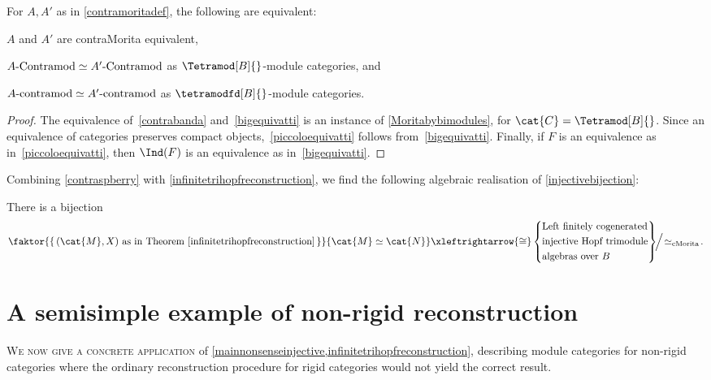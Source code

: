 \begin{proposition}\label{contraspberry}
  For \(A,A'\) as in \cref{contramoritadef}, the following are equivalent:
  \begin{thmlist}[noitemsep]
    \item\label{contrabanda} \(A\) and \(A'\) are contraMorita equivalent,
    \item\label{bigequivatti} \(A\textnormal{-Contramod} \simeq A'\textnormal{-Contramod}\) as \(\Tetramod[B]{}\)\hyp{}module categories, and
    \item\label{piccoloequivatti} \(A\textnormal{-contramod} \simeq A'\textnormal{-contramod}\) as \(\tetramodfd[B]{}\)\hyp{}module categories.
  \end{thmlist}
\end{proposition}
\begin{proof}
  The equivalence of~\ref{contrabanda} and~\ref{bigequivatti} is an instance of \cref{Moritabybimodules},
  for \(\cat{C} = \Tetramod[B]{}\).
  Since an equivalence of categories preserves compact objects,~\ref{piccoloequivatti} follows from~\ref{bigequivatti}.
  Finally, if \(F\) is an equivalence as in~\ref{piccoloequivatti}, then \(\Ind(F)\) is an equivalence as in~\ref{bigequivatti}.
\end{proof}

Combining \cref{contraspberry} with \cref{infinitetrihopfreconstruction},
we find the following algebraic realisation of \cref{injectivebijection}:

\begin{theorem}\label{contramodulereuters}
  There is a bijection
  \[
    \faktor{\{\,(\cat{M},X) \text{ as in Theorem~\ref{infinitetrihopfreconstruction}}\,\}}{\cat{M} \simeq \cat{N}}
    \xleftrightarrow{\cong}
    \left\{
    \begin{aligned}
      &\text{Left finitely cogenerated} \\
      &\text{injective Hopf trimodule} \\
      &\text{algebras over \(B\)}
    \end{aligned}
    \right\}
    \!\!\Big/\!\simeq_{\text{cMorita}}\!.
  \]
\end{theorem}

\section{A semisimple example of non-rigid reconstruction}\label{coreps}

\textsc{We now give a concrete application} of \cref{mainnonsenseinjective,infinitetrihopfreconstruction},
describing module categories for non-rigid categories
where the ordinary reconstruction procedure for rigid categories would not yield the correct result.

